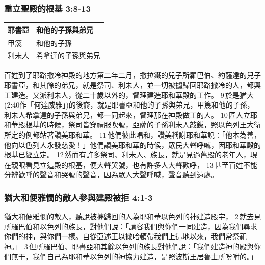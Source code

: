\subsubsection{重立聖殿的根基 3:8-13}
\begin{table}[H]
\centering 
\begin{tabular}{p{3cm}|p{4cm}}
\hline
\hline
耶書亞&和他的子孫與弟兄  \\\hline
甲篾&和他的子孫\\\hline
利未人&希拿達的子孫與弟兄\\\hline
\end{tabular}
\end{table}
百姓到了耶路撒冷神殿的地方第二年二月，撒拉鐵的兒子所羅巴伯、約薩達的兒子耶書亞，和其餘的弟兄，就是祭司、利未人，並一切被擄歸回耶路撒冷的人，都興工建造。又派利未人，從二十歲以外的，督理建造耶和華殿的工作。 9 於是猶大(2:40作「何達威雅」)的後裔，就是耶書亞和他的子孫與弟兄，甲篾和他的子孫，利未人希拿達的子孫與弟兄，都一同起來，督理那在神殿做工的人。 10 匠人立耶和華殿根基的時候，祭司皆穿禮服吹號，亞薩的子孫利未人敲鈸，照以色列王大衛所定的例都站著讚美耶和華。 11 他們彼此唱和，讚美稱謝耶和華說：「他本為善，他向以色列人永發慈愛！」他們讚美耶和華的時候，眾民大聲呼喊，因耶和華殿的根基已經立定。 12 然而有許多祭司、利未人、族長，就是見過舊殿的老年人，現在親眼看見立這殿的根基，便大聲哭號，也有許多人大聲歡呼， 13 甚至百姓不能分辨歡呼的聲音和哭號的聲音，因為眾人大聲呼喊，聲音聽到遠處。


\subsubsection{猶大和便雅憫的敵人參與建殿被拒 4:1-3}
猶大和便雅憫的敵人，聽說被擄歸回的人為耶和華以色列的神建造殿宇， 2 就去見所羅巴伯和以色列的族長，對他們說：「請容我們與你們一同建造，因為我們尋求你們的神，與你們一樣。自從亞述王以撒哈頓帶我們上這地以來，我們常祭祀神。」 3 但所羅巴伯、耶書亞和其餘以色列的族長對他們說：「我們建造神的殿與你們無干，我們自己為耶和華以色列的神協力建造，是照波斯王居魯士所吩咐的。」

